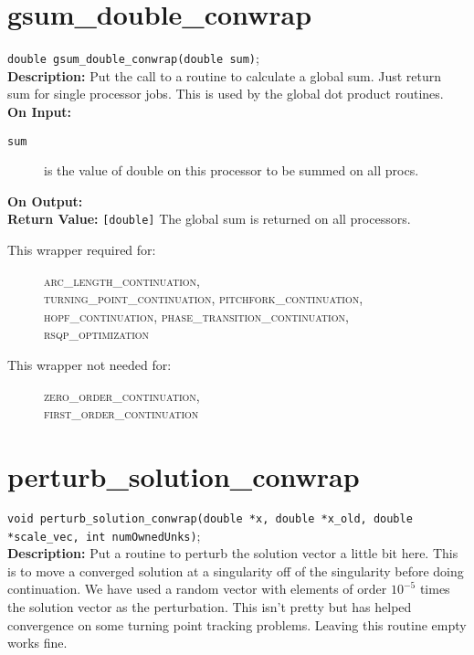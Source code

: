 
\section{gsum\_double\_conwrap}
\texttt{double gsum\_double\_conwrap(double sum)}; \\

{\bf Description:}   Put the call to a routine to calculate a global sum.  Just return sum for single processor jobs. This is used by the global dot product routines.\\

{\bf On Input:}
\begin{description}
\item[\texttt{sum}]  is the value of double on this processor to be summed on all procs.
\end{description}

{\bf On Output:} \\

{\bf Return Value:} \texttt{[double]} The global sum is returned on all processors.

\begin{description}
\item[This wrapper required for:]
\textsc{arc\_length\_continuation, \\
turning\_point\_continuation, pitchfork\_continuation, \\
hopf\_continuation, phase\_transition\_continuation, \\
rsqp\_optimization}
\item[This wrapper not needed for:]
\textsc{zero\_order\_continuation,\\
first\_order\_continuation}
\end{description}

\section{perturb\_solution\_conwrap}
\texttt{void perturb\_solution\_conwrap(double *x, double *x\_old,
                      double *scale\_vec, int numOwnedUnks)}; \\

{\bf Description:}   Put a routine to perturb the solution vector a little bit here. This is to move a converged solution at a singularity off of the singularity before doing continuation. We have used a random vector with elements of order $10^{-5}$ times the solution vector as the perturbation. This isn't pretty but has helped convergence on some turning point tracking problems. Leaving this routine empty works fine.\\

